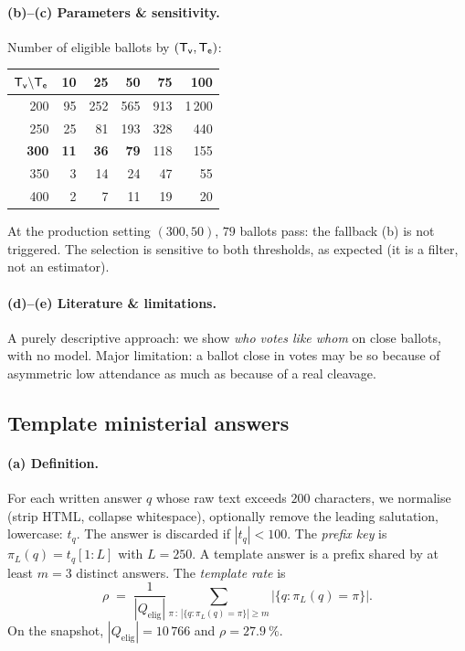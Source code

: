 \paragraph{(b)--(c) Parameters \& sensitivity.} Number of eligible ballots by
$(\mathsf{T_v},\mathsf{T_e})$:
\begin{center}\small
\begin{tabular}{r|rrrrr}
\toprule
$\mathsf{T_v}\backslash\mathsf{T_e}$ & 10 & 25 & 50 & 75 & 100 \\
\midrule
200 & \phantom{0}95 & 252 & 565 & 913 & 1\,200 \\
250 & \phantom{0}25 & \phantom{0}81 & 193 & 328 & \phantom{0,}440 \\
\textbf{300} & \phantom{0}\textbf{11} & \phantom{0}\textbf{36} & \phantom{00}\textbf{79} & 118 & \phantom{0,}155 \\
350 & \phantom{00}3 & \phantom{0}14 & \phantom{00}24 & \phantom{0}47 & \phantom{0,0}55 \\
400 & \phantom{00}2 & \phantom{00}7 & \phantom{00}11 & \phantom{0}19 & \phantom{0,0}20 \\
\bottomrule
\end{tabular}
\end{center}
At the production setting $(300,50)$, $79$ ballots pass: the fallback (b) is not
triggered. The selection is sensitive to both thresholds, as expected (it is a
filter, not an estimator).

\paragraph{(d)--(e) Literature \& limitations.} A purely descriptive approach: we
show \emph{who votes like whom} on close ballots, with no model. Major limitation:
a ballot \og{}close in votes\fg{} may be so because of asymmetric low attendance as
much as because of a real cleavage.

\subsection{\og{}Template\fg{} ministerial answers}\label{sec:templates-en}

\paragraph{(a) Definition.} For each written answer $q$ whose raw text exceeds
$200$ characters, we normalise (strip HTML, collapse whitespace), optionally remove
the leading salutation, lowercase: $t_q$. The answer is discarded if $|t_q|<100$.
The \emph{prefix key} is $\pi_L(q)=t_q[1:L]$ with $L=250$. A \og{}template
answer\fg{} is a prefix shared by at least $m=3$ distinct answers. The
\emph{template rate} is
\[
\rho \;=\; \frac{1}{|Q_{\text{elig}}|}\sum_{\pi \,:\, |\{q:\pi_L(q)=\pi\}|\ge m} \big|\{q:\pi_L(q)=\pi\}\big|.
\]
On the snapshot, $|Q_{\text{elig}}|=10\,766$ and $\rho=27.9~\%$.

